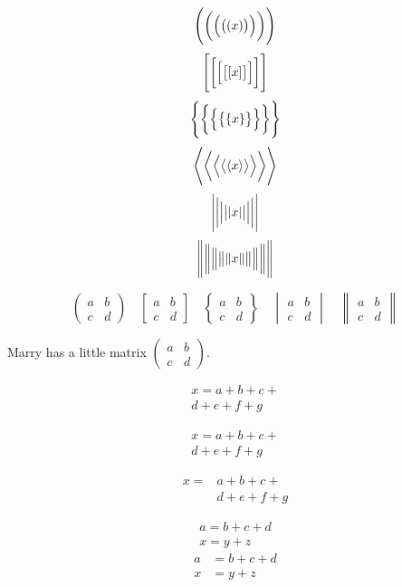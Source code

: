 \documentclass[UTF8]{ctexart}
\begin{document}
\[ \Biggl(\biggl(\Bigl(\bigl((x)\bigr)\Bigr)\biggr)\Biggr) \]
\[ \Biggl[\biggl[\Bigl[\bigl[[x]\bigr]\Bigr]\biggr]\Biggr] \]
\[ \Biggl \{\biggl \{\Bigl \{\bigl \{\{x\}\bigr \}\Bigr \}\biggr \}\Biggr\} \]
\[ \Biggl\langle\biggl\langle\Bigl\langle\bigl\langle\langle x
\rangle\bigr\rangle\Bigr\rangle\biggr\rangle\Biggr\rangle \]
\[ \Biggl\lvert\biggl\lvert\Bigl\lvert\bigl\lvert\lvert x
\rvert\bigr\rvert\Bigr\rvert\biggr\rvert\Biggr\rvert \]
\[ \Biggl\lVert\biggl\lVert\Bigl\lVert\bigl\lVert\lVert x
\rVert\bigr\rVert\Bigr\rVert\biggr\rVert\Biggr\rVert \]

\[ \begin{pmatrix} a&b\\c&d \end{pmatrix} \quad
\begin{bmatrix} a&b\\c&d \end{bmatrix} \quad
\begin{Bmatrix} a&b\\c&d \end{Bmatrix} \quad
\begin{vmatrix} a&b\\c&d \end{vmatrix} \quad
\begin{Vmatrix} a&b\\c&d \end{Vmatrix} \]

Marry has a little matrix $ ( \begin{smallmatrix} a&b\\c&d \end{smallmatrix} ) $.

\begin{multline}
    x = a+b+c+{} \\
    d+e+f+g
\end{multline}

\begin{multline*}
    x = a+b+c+{} \\
    d+e+f+g
\end{multline*}

\[\begin{aligned}
    x ={}& a+b+c+{} \\
    &d+e+f+g
\end{aligned}\]

\begin{gather}
    a = b+c+d \\
    x = y+z
\end{gather}
\begin{align}
    a &= b+c+d \\
    x &= y+z
\end{align}
\end{document}
